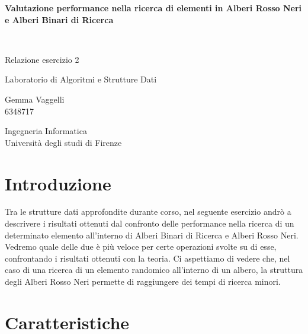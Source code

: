 \documentclass[12pt]{article}
\begin{document}
\begin{titlepage}
   \begin{center}
       \vspace*{1cm}
	   \begin{Huge}
       \textbf{Valutazione performance nella ricerca di
        elementi in Alberi Rosso Neri e Alberi Binari di
         Ricerca}
	   \end{Huge}
       \vspace{1.5cm}
       \\
       \begin{Large}
        Relazione esercizio 2
            
       \vspace{1.5cm}

       Laboratorio di Algoritmi e Strutture Dati
	   \vspace{3cm}
            
       Gemma Vaggelli \\
       6348717
            
       \vfill
     
    
            
       Ingegneria Informatica\\
       Università degli studi di Firenze
       \end{Large}
       
            
   \end{center}
\end{titlepage}

\section{Introduzione}
Tra le strutture dati approfondite durante corso, nel seguente esercizio andrò a descrivere i risultati ottenuti dal confronto delle performance nella ricerca di un determinato elemento all'interno di Alberi Binari di Ricerca e Alberi Rosso Neri.
Vedremo quale delle due è più veloce per certe operazioni svolte su di esse, confrontando i risultati ottenuti con la teoria.
Ci aspettiamo di vedere che, nel caso di una ricerca di un elemento randomico all’interno di un albero, la struttura degli Alberi Rosso Neri permette di raggiungere dei tempi di ricerca minori.

\section{Caratteristiche}
\end{document}
